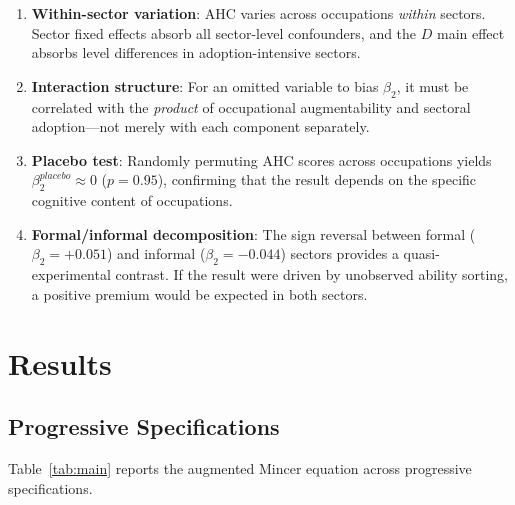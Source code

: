 \documentclass[11pt,a4paper]{article}
\theoremstyle{definition}
\begin{document}
\begin{enumerate}[leftmargin=*]
\item \textbf{Within-sector variation}: AHC varies across occupations \textit{within} sectors. Sector fixed effects absorb all sector-level confounders, and the $D$ main effect absorbs level differences in adoption-intensive sectors.

\item \textbf{Interaction structure}: For an omitted variable to bias $\beta_2$, it must be correlated with the \textit{product} of occupational augmentability and sectoral adoption---not merely with each component separately.

\item \textbf{Placebo test}: Randomly permuting AHC scores across occupations yields $\beta_2^{placebo} \approx 0$ ($p = 0.95$), confirming that the result depends on the specific cognitive content of occupations.

\item \textbf{Formal/informal decomposition}: The sign reversal between formal ($\beta_2 = +0.051$) and informal ($\beta_2 = -0.044$) sectors provides a quasi-experimental contrast. If the result were driven by unobserved ability sorting, a positive premium would be expected in both sectors.
\end{enumerate}


\section{Results}
\label{sec:results}

\subsection{Progressive Specifications}

Table~\ref{tab:main} reports the augmented Mincer equation across progressive specifications.
\end{document}
